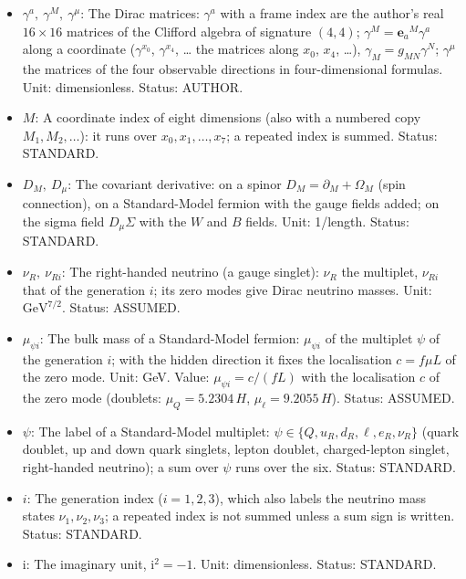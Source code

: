 \documentclass[
  10pt,
]{article}
\providecommand{\tightlist}{%
  \setlength{\itemsep}{0pt}\setlength{\parskip}{0pt}}
\begin{document}
\begin{itemize}
\tightlist
\item
  \(\gamma^a,\ \gamma^M,\ \gamma^\mu\): The Dirac matrices: \(\gamma^a\)
  with a frame index are the author's real \(16 \times 16\) matrices of
  the Clifford algebra of signature \((4, 4)\);
  \(\gamma^M = \mathbf{e}_a{}^M\gamma^a\) along a coordinate
  (\(\gamma^{x_0}\), \(\gamma^{x_4}\), \ldots{} the matrices along
  \(x_0\), \(x_4\), \ldots), \(\gamma_M = g_{MN}\gamma^N\);
  \(\gamma^\mu\) the matrices of the four observable directions in
  four-dimensional formulas. Unit: dimensionless. Status: AUTHOR.
\item
  \(M\): A coordinate index of eight dimensions (also with a numbered
  copy \(M_1, M_2, \dots\)): it runs over \(x_0, x_1, \dots, x_7\); a
  repeated index is summed. Status: STANDARD.
\item
  \(D_M,\ D_\mu\): The covariant derivative: on a spinor
  \(D_M = \partial_M + \Omega_M\) (spin connection), on a Standard-Model
  fermion with the gauge fields added; on the sigma field
  \(D_\mu\Sigma\) with the \(W\) and \(B\) fields. Unit: 1/length.
  Status: STANDARD.
\item
  \(\nu_R,\ \nu_{Ri}\): The right-handed neutrino (a gauge singlet):
  \(\nu_R\) the multiplet, \(\nu_{Ri}\) that of the generation \(i\);
  its zero modes give Dirac neutrino masses. Unit:
  \(\mathrm{GeV}^{7/2}\). Status: ASSUMED.
\item
  \(\mu_{\psi i}\): The bulk mass of a Standard-Model fermion:
  \(\mu_{\psi i}\) of the multiplet \(\psi\) of the generation \(i\);
  with the hidden direction it fixes the localisation \(c = f\mu L\) of
  the zero mode. Unit: GeV. Value: \(\mu_{\psi i} = c/(fL)\) with the
  localisation \(c\) of the zero mode (doublets: \(\mu_Q = 5.2304\,H\),
  \(\mu_\ell = 9.2055\,H\)). Status: ASSUMED.
\item
  \(\psi\): The label of a Standard-Model multiplet:
  \(\psi \in \{Q, u_R, d_R, \ell, e_R, \nu_R\}\) (quark doublet, up and
  down quark singlets, lepton doublet, charged-lepton singlet,
  right-handed neutrino); a sum over \(\psi\) runs over the six. Status:
  STANDARD.
\item
  \(i\): The generation index (\(i = 1, 2, 3\)), which also labels the
  neutrino mass states \(\nu_1, \nu_2, \nu_3\); a repeated index is not
  summed unless a sum sign is written. Status: STANDARD.
\item
  \(\mathrm{i}\): The imaginary unit, \(\mathrm{i}^2 = -1\). Unit:
  dimensionless. Status: STANDARD.

\end{itemize}
\end{document}

